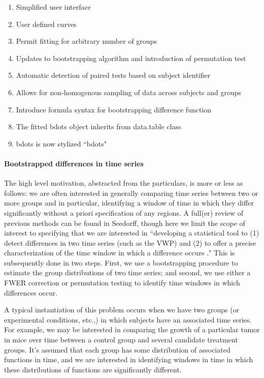 \documentclass{article}
\begin{document}
\begin{enumerate}
\item Simplified user interface
\item User defined curves
\item Permit fitting for arbitrary number of groups
\item Updates to bootstrapping algorithm and introduction of permutation test
\item Automatic detection of paired tests based on subject identifier
\item Allows for non-homogenous sampling of data across subjects and groups
\item Introduce formula syntax for bootstrapping difference function
\item The fitted bdots object inherits from data.table class
\item bdots is now stylized ``bdots"
\end{enumerate}

\paragraph{Bootstrapped differences in time series}

The high level motivation, abstracted from the particulars, is more or less as follows: we are often interested in generally comparing time series between two or more groups and in particular, identifying a window of time in which they differ significantly without a priori specification of any regions. A full(er) review of previous methods can be found in Seedorff, though here we limit the scope of interest to specifying that we are interested in ``developing a statistical tool to (1) detect differences in two time series (such as the VWP) and (2) to offer a precise characterization of the time window in which a difference occurs \cite{seedorff2018bdots}." This is subsequently done in two steps. First, we use a bootstrapping procedure to estimate the group distributions of two time series; and second, we use either a FWER correction or permutation testing to identify time windows in which differences occur.

A typical instantiation of this problem occurs when we have two groups (or experimental conditions, etc.,) in which subjects have an associated time series. For example, we may be interested in comparing the growth of a particular tumor in mice over time between a control group and several candidate treatment groups. It's assumed that each group has some distribution of associated functions in time, and we are interested in identifying windows in time in which these distributions of functions are significantly different.
\end{document}
